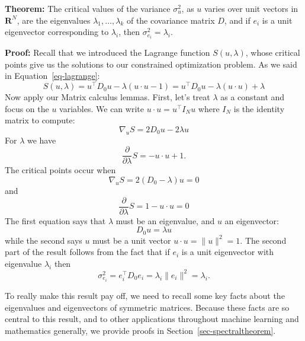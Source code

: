 \documentclass[
  11pt,
  letterpaper,
]{scrbook}
\theoremstyle{plain}
\theoremstyle{remark}
\begin{document}
\textbf{Theorem:} The critical values of the variance \(\sigma_{u}^2\),
as \(u\) varies over unit vectors in \(\mathbf{R}^{N}\), are the
eigenvalues \(\lambda_{1},\ldots,\lambda_{k}\) of the covariance matrix
\(D\), and if \(e_{i}\) is a unit eigenvector corresponding to
\(\lambda_{i}\), then \(\sigma_{e_{i}}^2 = \lambda_{i}\).

\textbf{Proof:} Recall that we introduced the Lagrange function
\(S(u,\lambda)\), whose critical points give us the solutions to our
constrained optimization problem. As we said in
Equation~\ref{eq-lagrange}: \[
S(u,\lambda) = u^{\intercal}D_{0}u - \lambda(u\cdot u - 1) = u^{\intercal}D_{0}u -\lambda(u\cdot u) + \lambda
\] Now apply our Matrix calculus lemmas. First, let's treat \(\lambda\)
as a constant and focus on the \(u\) variables. We can write
\(u\cdot u = u^{\intercal} I_{N} u\) where \(I_{N}\) is the identity
matrix to compute: \[
\nabla_{u} S = 2D_{0}u -2\lambda u
\] For \(\lambda\) we have \[
\frac{\partial}{\partial \lambda}S = -u\cdot u +1.
\] The critical points occur when \[
\nabla_{u} S = 2(D_{0}-\lambda)u = 0
\] and \[
\frac{\partial}{\partial \lambda}S = 1-u\cdot u = 0
\] The first equation says that \(\lambda\) must be an eigenvalue, and
\(u\) an eigenvector: \[
D_{0}u = \lambda u
\] while the second says \(u\) must be a unit vector
\(u\cdot u=\|u\|^2=1\). The second part of the result follows from the
fact that if \(e_{i}\) is a unit eigenvector with eigenvalue
\(\lambda_{i}\) then \[
\sigma_{e_{i}}^2 = e_{i}^{\intercal}D_{0}e_{i} = \lambda_{i}\|e_{i}\|^2=\lambda_{i}.
\]

To really make this result pay off, we need to recall some key facts
about the eigenvalues and eigenvectors of symmetric matrices. Because
these facts are so central to this result, and to other applications
throughout machine learning and mathematics generally, we provide proofs
in Section~\ref{sec-spectraltheorem}.

\newpage
\end{document}
